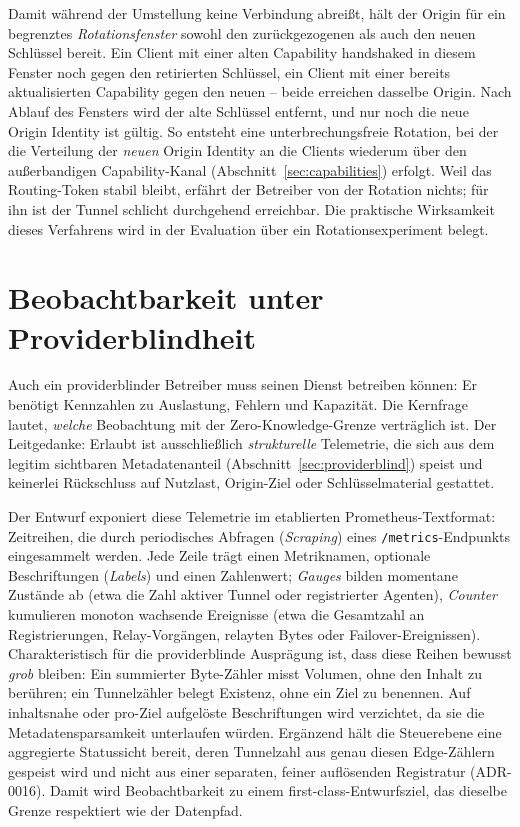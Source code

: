 Damit während der Umstellung keine Verbindung abreißt, hält der Origin für ein
begrenztes \emph{Rotationsfenster} sowohl den zurückgezogenen als auch den neuen
Schlüssel bereit. Ein Client mit einer alten Capability handshaked in diesem
Fenster noch gegen den retirierten Schlüssel, ein Client mit einer bereits
aktualisierten Capability gegen den neuen -- beide erreichen dasselbe Origin.
Nach Ablauf des Fensters wird der alte Schlüssel entfernt, und nur noch die neue
Origin Identity ist gültig. So entsteht eine unterbrechungsfreie Rotation, bei
der die Verteilung der \emph{neuen} Origin Identity an die Clients wiederum über
den außerbandigen Capability-Kanal (Abschnitt~\ref{sec:capabilities}) erfolgt.
Weil das Routing-Token stabil bleibt, erfährt der Betreiber von der Rotation
nichts; für ihn ist der Tunnel schlicht durchgehend erreichbar. Die praktische
Wirksamkeit dieses Verfahrens wird in der Evaluation über ein
Rotationsexperiment belegt.

\section{Beobachtbarkeit unter Providerblindheit}
\label{sec:grdl-observability}

Auch ein providerblinder Betreiber muss seinen Dienst betreiben können: Er
benötigt Kennzahlen zu Auslastung, Fehlern und Kapazität. Die Kernfrage lautet,
\emph{welche} Beobachtung mit der Zero-Knowledge-Grenze verträglich ist. Der
Leitgedanke: Erlaubt ist ausschließlich \emph{strukturelle} Telemetrie, die sich
aus dem legitim sichtbaren Metadatenanteil (Abschnitt~\ref{sec:providerblind})
speist und keinerlei Rückschluss auf Nutzlast, Origin-Ziel oder
Schlüsselmaterial gestattet.

Der Entwurf exponiert diese Telemetrie im etablierten Prometheus-Textformat:
Zeitreihen, die durch periodisches Abfragen (\emph{Scraping}) eines
\texttt{/metrics}-Endpunkts eingesammelt werden. Jede Zeile trägt einen
Metriknamen, optionale Beschriftungen (\emph{Labels}) und einen Zahlenwert;
\emph{Gauges} bilden momentane Zustände ab (etwa die Zahl aktiver Tunnel oder
registrierter Agenten), \emph{Counter} kumulieren monoton wachsende Ereignisse
(etwa die Gesamtzahl an Registrierungen, Relay-Vorgängen, relayten Bytes oder
Failover-Ereignissen). Charakteristisch für die providerblinde Ausprägung ist,
dass diese Reihen bewusst \emph{grob} bleiben: Ein summierter Byte-Zähler misst
Volumen, ohne den Inhalt zu berühren; ein Tunnelzähler belegt Existenz, ohne ein
Ziel zu benennen. Auf inhaltsnahe oder pro-Ziel aufgelöste Beschriftungen wird
verzichtet, da sie die Metadatensparsamkeit unterlaufen würden. Ergänzend hält
die Steuerebene eine aggregierte Statussicht bereit, deren Tunnelzahl aus genau
diesen Edge-Zählern gespeist wird und nicht aus einer separaten, feiner
auflösenden Registratur (ADR-0016). Damit wird Beobachtbarkeit zu einem
first-class-Entwurfsziel, das dieselbe Grenze respektiert wie der Datenpfad.

